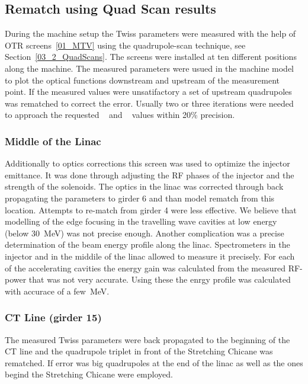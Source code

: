 \subsection{Rematch using Quad Scan results}

During the machine setup the Twiss parameters were measured with the help of OTR screens~\ref{01_MTV}
using the quadrupole-scan technique, see Section~\ref{03_2_QuadScans}. 
The screens were installed at ten different positions along the machine. 
The measured parameters were usued in the machine model to plot the optical functions
downstream and upstream of the measurement point. 
If the measured values were unsatifactory a set of upstream quadrupoles was rematched to correct the error.
Usually two or three iterations were needed to approach the requested 
\textalpha~ and \textbeta~ values within 20\% precision.



\subsubsection{Middle of the Linac }

Additionally to optics corrections this screen was used to optimize the injector emittance. 
It was done through adjusting the RF phases of the injector and the strength of the solenoids. 
The optics in the linac was corrected through back propagating the parameters to girder 6 and 
than model rematch from this location. Attempts to re-match from girder 4 were less effective. 
We believe that modelling of the edge focusing in the travelling wave cavities at low energy
(below 30~MeV) was not precise enough.
Another complication was a precise determination of the beam energy profile along the linac. 
Spectrometers in the injector and in the middile of the linac allowed to measure it precisely.  
For each of the accelerating cavities the energy gain was calculated from 
the measured RF-power that was not very accurate. 
Using these the enrgy profile was calculated with accurace of a few~MeV. 

\subsubsection{CT Line (girder 15)}

The measured Twiss parameters were back propagated to the beginning of the CT line
and the quadrupole triplet in front of the Stretching Chicane was rematched.
If error was big quadrupoles at the end of the linac as well as the ones
begind the Stretching Chicane were employed.

